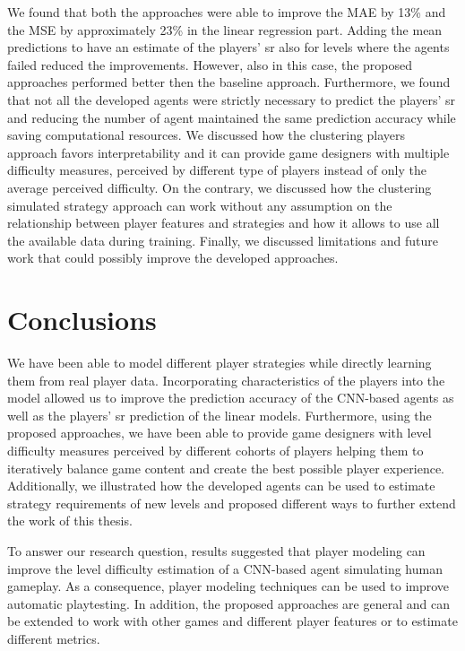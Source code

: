 We found that both the approaches were able to improve the \acs{MAE} by 13\% and the \acs{MSE} by approximately 23\% in the linear regression part. Adding the mean predictions to have an estimate of the players' \acs{sr} also for levels where the agents failed reduced the improvements. However, also in this case, the proposed approaches performed better then the baseline approach. 
Furthermore, we found that not all the developed agents were strictly necessary to predict the players' \acs{sr} and reducing the number of agent maintained the same prediction accuracy while saving computational resources. We discussed how the clustering players approach favors interpretability and it can provide game designers with multiple difficulty measures, perceived by different type of players instead of only the average perceived difficulty. On the contrary, we discussed how the clustering simulated strategy approach can work without any assumption on the relationship between player features and strategies and how it allows to use all the available data during training. Finally, we discussed limitations and future work that could possibly improve the developed approaches.

\section{Conclusions}
We have been able to model different player strategies while directly learning them from real player data. Incorporating characteristics of the players into the model allowed us to improve the prediction accuracy of the \acs{CNN}-based agents as well as the players' \acs{sr} prediction of the linear models. Furthermore, using the proposed approaches, we have been able to provide game designers with level difficulty measures perceived by different cohorts of players helping them to iteratively balance game content and create the best possible player experience. Additionally, we illustrated how the developed agents can be used to estimate strategy requirements of new levels and proposed different ways to further extend the work of this thesis.

To answer our research question, results suggested that player modeling can improve the level difficulty estimation of a \acs{CNN}-based agent simulating human gameplay. As a consequence, player modeling techniques can be used to improve automatic playtesting. In addition, the proposed approaches are general and can be extended to work with other games and different player features or to estimate different metrics. 